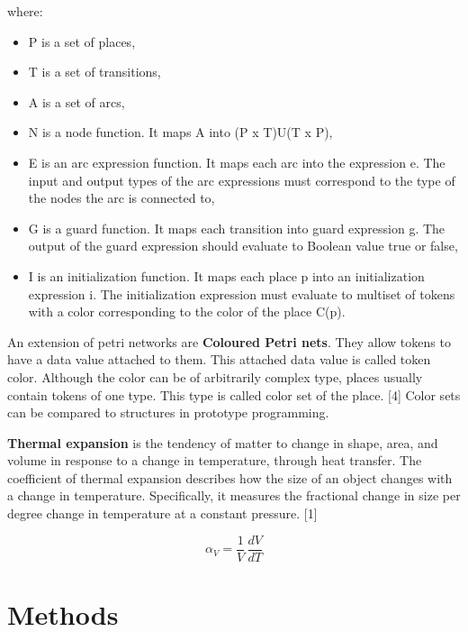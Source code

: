 \documentclass[a4paper]{article}
\begin{document}
where:
\begin{itemize}
  \setlength{\itemsep}{1pt}
  \setlength{\parskip}{0pt}
  \setlength{\parsep}{0pt}
\item P is a set of places,
\item T is a set of transitions,
\item A is a set of arcs,
\item N is a node function. It maps A into (P x T)U(T x P),
\item E is an arc expression function. It maps each arc into the expression e. The input and output types of the arc expressions must correspond to the type of the nodes the arc is connected to,
\item G is a guard function. It maps each transition into guard expression g. The output of the guard expression should evaluate to Boolean value true or false,
\item I is an initialization function. It maps each place p into an initialization expression i. The initialization expression must evaluate to multiset of tokens with a color corresponding to the color of the place C(p).\\
\end{itemize}

An extension of petri networks are \textbf{Coloured Petri nets}. They allow tokens to have a data value attached to them. This attached data value is called token color. Although the color can be of arbitrarily complex type, places usually contain tokens of one type. This type is called color set of the place. [4] Color sets can be compared to structures in prototype programming.

\clearpage

\textbf{Thermal expansion} is the tendency of matter to change in shape, area, and volume in response to a change in temperature, through heat transfer. The coefficient of thermal expansion describes how the size of an object changes with a change in temperature. Specifically, it measures the fractional change in size per degree change in temperature at a constant pressure. [1]

\begin{equation}
\alpha_V = \frac{1}{V}\,\frac{dV}{dT}
\end{equation}

%
\section{Methods}
\end{document}
